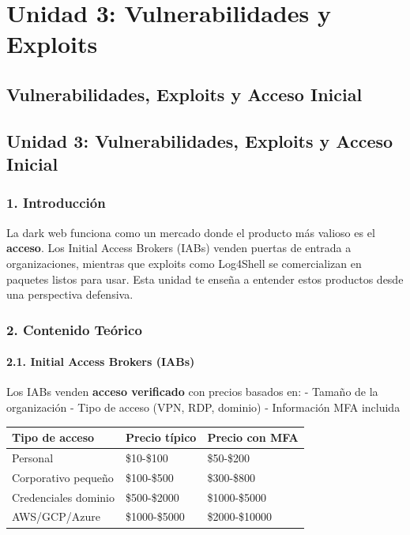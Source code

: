 \documentclass[
  letterpaper,
]{report}
\newcounter{none} %
\begin{document}
\part{Unidad 3: Vulnerabilidades y Exploits}

\chapter{Vulnerabilidades, Exploits y Acceso
Inicial}\label{vulnerabilidades-exploits-y-acceso-inicial}

\chapter{Unidad 3: Vulnerabilidades, Exploits y Acceso
Inicial}\label{unidad-3-vulnerabilidades-exploits-y-acceso-inicial}

\section{1. Introducción}\label{introducciuxf3n-2}

La dark web funciona como un mercado donde el producto más valioso es el
\textbf{acceso}. Los Initial Access Brokers (IABs) venden puertas de
entrada a organizaciones, mientras que exploits como Log4Shell se
comercializan en paquetes listos para usar. Esta unidad te enseña a
entender estos productos desde una perspectiva defensiva.

\section{2. Contenido Teórico}\label{contenido-teuxf3rico-2}

\subsection{2.1. Initial Access Brokers
(IABs)}\label{initial-access-brokers-iabs}

Los IABs venden \textbf{acceso verificado} con precios basados en: -
Tamaño de la organización - Tipo de acceso (VPN, RDP, dominio) -
Información MFA incluida

{\def\LTcaptype{none} %
\begin{longtable}[]{@{}lll@{}}
\toprule\noalign{}
Tipo de acceso & Precio típico & Precio con MFA \\
\midrule\noalign{}
\endhead
\bottomrule\noalign{}
\endlastfoot
Personal & \$10-\$100 & \$50-\$200 \\
Corporativo pequeño & \$100-\$500 & \$300-\$800 \\
Credenciales dominio & \$500-\$2000 & \$1000-\$5000 \\
AWS/GCP/Azure & \$1000-\$5000 & \$2000-\$10000 \\
\end{longtable}
}
\end{document}
